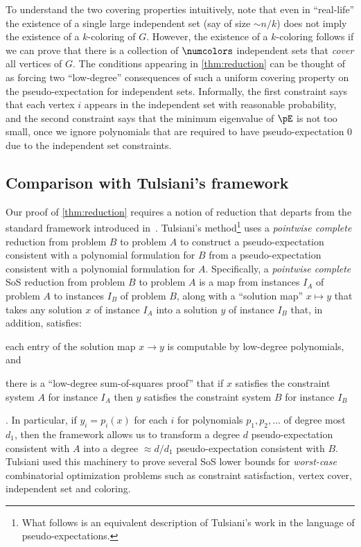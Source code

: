 To understand the two covering properties intuitively, note that even in ``real-life'' the existence of a single large independent set (say of size $\sim n/k$) does not imply the existence of a $k$-coloring of $G$. However, the existence of a $k$-coloring follows if we can prove that there is a collection of $\numcolors$ independent sets that \emph{cover} all vertices of $G$. The conditions appearing in \cref{thm:reduction} can be thought of as forcing two ``low-degree'' consequences of such a uniform covering property on the pseudo-expectation for independent sets. Informally, the first constraint says that each vertex $i$ appears in the independent set with reasonable probability, and the second constraint says that the minimum eigenvalue of $\pE$ is not too small, once we ignore polynomials that are required to have pseudo-expectation $0$ due to the independent set constraints.


\subsection{Comparison with Tulsiani's framework} 
\label{sec:tul}

Our proof of \cref{thm:reduction} requires a notion of reduction that departs from the standard framework introduced in~\cite{DBLP:conf/stoc/Tulsiani09}. Tulsiani's method\footnote{What follows is an equivalent description of Tulsiani's work in the language of pseudo-expectations.} uses a \emph{pointwise complete} reduction from problem $B$ to problem $A$ to construct a pseudo-expectation consistent with a polynomial formulation for $B$ from a pseudo-expectation consistent with a polynomial formulation for $A$. Specifically, a \emph{pointwise complete} SoS reduction from problem $B$ to problem $A$ is a map from instances $I_A$ of problem $A$ to instances $I_B$ of problem $B$, along with a ``solution map'' $x \mapsto y$ 
that takes any solution $x$ of instance $I_A$ into a solution $y$ of instance $I_B$ that, in addition, satisfies: \begin{inparaenum}[(1)] \item each entry of the solution map $x\rightarrow y$ is computable by low-degree polynomials, and \item there is a ``low-degree sum-of-squares proof'' that if $x$ satisfies the constraint system $A$ for instance $I_A$ then $y$ satisfies the constraint system $B$ for instance $I_B$ \end{inparaenum}. In particular, if $y_i = p_i(x)$ for each $i$ for polynomials $p_1, p_2, \ldots$ of degree most $d_1$, then the framework allows us to transform a degree $d$ pseudo-expectation consistent with $A$ into a degree $\approx d/d_1$ pseudo-expectation consistent with $B$.  Tulsiani used this machinery to prove several SoS lower bounds for \emph{worst-case} combinatorial optimization problems such as constraint satisfaction, vertex cover, independent set and coloring. 

